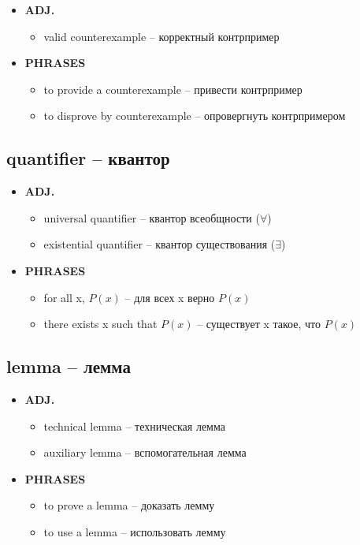 \documentclass[a4paper, 10pt]{article}
\theoremstyle{definition}
\theoremstyle{plain}
\theoremstyle{remark}
\begin{document}
\begin{itemize}
    \item \textbf{ADJ.}
    \begin{itemize}
        \item valid counterexample – корректный контрпример
    \end{itemize}
    
    \item \textbf{PHRASES}
    \begin{itemize}
        \item to provide a counterexample – привести контрпример
        \item to disprove by counterexample – опровергнуть контрпримером
    \end{itemize}
\end{itemize}

\subsection{quantifier – квантор}

\begin{itemize}
    \item \textbf{ADJ.}
    \begin{itemize}
        \item universal quantifier – квантор всеобщности ($\forall$)
        \item existential quantifier – квантор существования ($\exists$)
    \end{itemize}
    
    \item \textbf{PHRASES}
    \begin{itemize}
        \item for all x, $P(x)$ – для всех x верно $P(x)$
        \item there exists x such that $P(x)$ – существует x такое, что $P(x)$
    \end{itemize}
\end{itemize}

\subsection{lemma – лемма}

\begin{itemize}
    \item \textbf{ADJ.}
    \begin{itemize}
        \item technical lemma – техническая лемма
        \item auxiliary lemma – вспомогательная лемма
    \end{itemize}
    
    \item \textbf{PHRASES}
    \begin{itemize}
        \item to prove a lemma – доказать лемму
        \item to use a lemma – использовать лемму
    \end{itemize}
\end{itemize}
\end{document}
